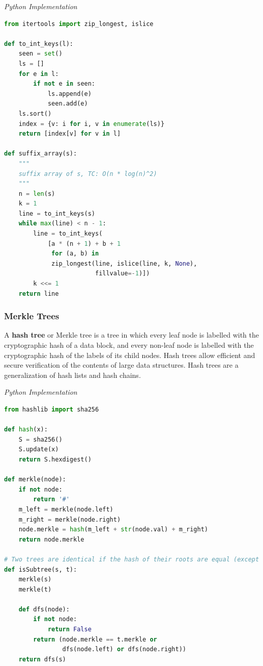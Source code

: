 \documentclass{article}
\begin{document}
\vspace{8pt} \emph{Python Implementation}
\begin{lstlisting}[language=Python]
from itertools import zip_longest, islice

def to_int_keys(l):
    seen = set()
    ls = []
    for e in l:
        if not e in seen:
            ls.append(e)
            seen.add(e)
    ls.sort()
    index = {v: i for i, v in enumerate(ls)}
    return [index[v] for v in l]

def suffix_array(s):
    """
    suffix array of s, TC: O(n * log(n)^2)
    """
    n = len(s)
    k = 1
    line = to_int_keys(s)
    while max(line) < n - 1:
        line = to_int_keys(
            [a * (n + 1) + b + 1
             for (a, b) in
             zip_longest(line, islice(line, k, None),
                         fillvalue=-1)])
        k <<= 1
    return line
\end{lstlisting}
    
    \subsubsection{Merkle Trees}
    A \textbf{hash tree} or Merkle tree is a tree in which every leaf node is labelled with the cryptographic hash of a data block, and every non-leaf node is labelled with the cryptographic hash of the labels of its child nodes. Hash trees allow efficient and secure verification of the contents of large data structures. Hash trees are a generalization of hash lists and hash chains.
    
\vspace{8pt} \emph{Python Implementation}
\begin{lstlisting}[language=Python]
from hashlib import sha256

def hash(x):
    S = sha256()
    S.update(x)
    return S.hexdigest()

def merkle(node):
    if not node:
        return '#'
    m_left = merkle(node.left)
    m_right = merkle(node.right)
    node.merkle = hash(m_left + str(node.val) + m_right)
    return node.merkle

# Two trees are identical if the hash of their roots are equal (except for collisions)
def isSubtree(s, t):
    merkle(s)
    merkle(t)
    
    def dfs(node):
        if not node:
            return False
        return (node.merkle == t.merkle or
                dfs(node.left) or dfs(node.right))
    return dfs(s)
\end{lstlisting}
\end{document}
